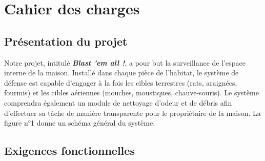 
\section{Cahier des charges}

\subsection{Présentation du projet}

Notre projet, intitulé \textit{\textbf{Blast 'em all !}}, a pour but la
surveillance de l'espace interne de la maison. Installé dans chaque pièce
de l'habitat, le système de défense est capable d'engager à la fois les
cibles terrestres (rats, araignées, fourmis) et les cibles aériennes
(mouches, moustiques, chauve-souris). Le système comprendra également un
module de nettoyage d'odeur et de débris afin d'effectuer sa tâche de
manière transparente pour le propriétaire de la maison. La figure n°1
donne un schéma général du système.


\subsection{Exigences fonctionnelles}

